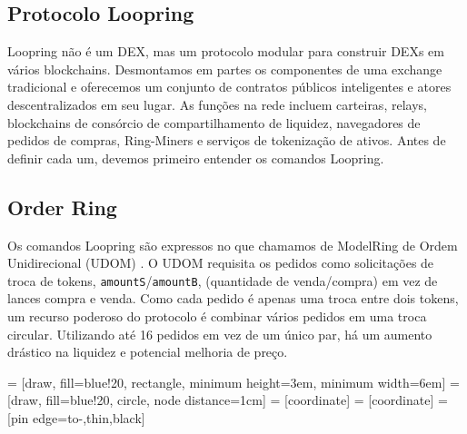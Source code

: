 \documentclass[UTF8,nofonts]{article}
\makeatletter
\newenvironment{figurehere}
 {\def\@captype{figure}}
 {}
\makeatother
\begin{document}
\begin{multicols}{2}
\section{Protocolo Loopring\label{sec:loopring_protocol}}
Loopring não é um DEX, mas um protocolo modular para construir DEXs em vários blockchains. Desmontamos em partes os componentes de uma exchange tradicional e oferecemos um conjunto de contratos públicos inteligentes e atores descentralizados em seu lugar. As funções na rede incluem carteiras, relays, blockchains de consórcio de compartilhamento de liquidez, navegadores de pedidos de compras, Ring-Miners e serviços de tokenização de ativos. Antes de definir cada um, devemos primeiro entender os comandos Loopring.

\subsection{Order Ring\label{sec:order_ring}}
Os comandos Loopring são expressos no que chamamos de ModelRing de Ordem Unidirecional (UDOM) \cite{coinport2014udom}. O UDOM requisita os pedidos como solicitações de troca de tokens, \verb|amountS|/\verb|amountB|, (quantidade de venda/compra) em vez de lances compra e venda. Como cada pedido é apenas uma troca entre dois tokens, um recurso poderoso do protocolo é combinar vários pedidos em uma troca circular. Utilizando até 16 pedidos em vez de um único par, há um aumento drástico na liquidez e potencial melhoria de preço.

\begin{center}
\begin{figurehere}
\centering
{} = [draw, fill=blue!20, rectangle, 
    minimum height=3em, minimum width=6em]
 = [draw, fill=blue!20, circle, node distance=1cm]
 = [coordinate]
 = [coordinate]
 = [pin edge={to-,thin,black}]

\end{figurehere}
\end{center}
\end{multicols}
\end{document}
